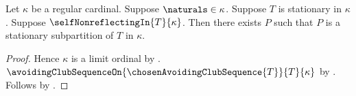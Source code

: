 \begin{theorem}\label{self_nonreflecting_stationary_subpartition}
    Let $\kappa$ be a regular cardinal.
    Suppose $\naturals\in\kappa$.
    Suppose $T$ is stationary in $\kappa$.
    Suppose $\selfNonreflectingIn{T}{\kappa}$.
    Then there exists $P$ such that
        $P$ is a stationary subpartition of $T$ in $\kappa$.
\end{theorem}
\begin{proof}
    Hence $\kappa$ is a limit ordinal
        by .
    $\avoidingClubSequenceOn{\chosenAvoidingClubSequence{T}}{T}{\kappa}$
        by .
    Follows by .
\end{proof}
